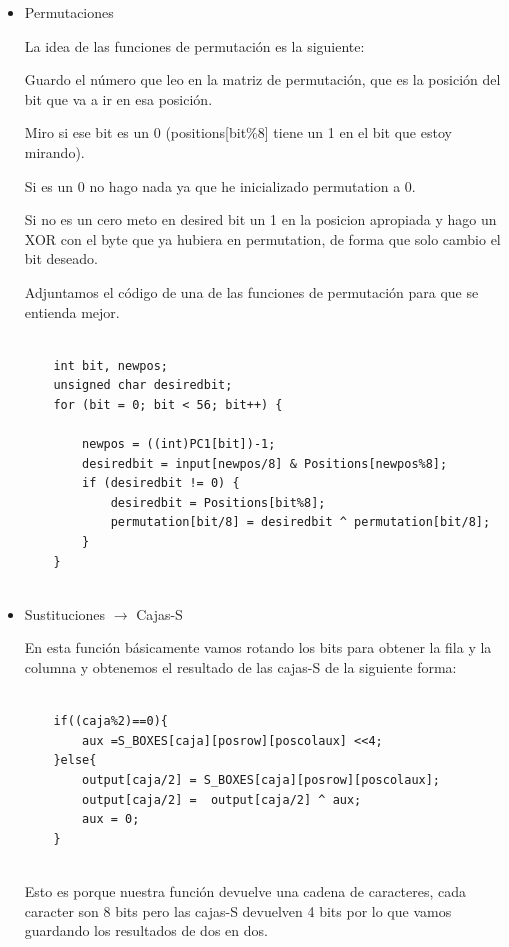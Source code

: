 \documentclass{apuntes}
\begin{document}
\begin{itemize}
	\item Permutaciones
	
	La idea de las funciones de permutación es la siguiente:
	
	Guardo el número que leo en la matriz de permutación, que es la posición del bit que va a ir en esa posición.
	
	Miro si ese bit es un 0 (positions[bit\%8] tiene un 1 en el bit que estoy mirando).
	
	Si es un 0 no hago nada ya que he inicializado permutation a 0.
	
	Si no es un cero meto en desired bit un 1 en la posicion apropiada y hago un 
	XOR con el byte que ya hubiera en permutation, de forma que solo cambio el bit deseado.
	
	Adjuntamos el código de una de las funciones de permutación para que se entienda mejor.
	
	\begin{lstlisting}
	
	int bit, newpos;
	unsigned char desiredbit;
	for (bit = 0; bit < 56; bit++) {
	
		newpos = ((int)PC1[bit])-1;
		desiredbit = input[newpos/8] & Positions[newpos%8]; 
		if (desiredbit != 0) {
			desiredbit = Positions[bit%8];
			permutation[bit/8] = desiredbit ^ permutation[bit/8];
		}
	}
	
	\end{lstlisting}
	
	\item Sustituciones $\rightarrow$ Cajas-S
	
	En esta función básicamente vamos rotando los bits para obtener la fila y la columna y obtenemos el resultado de las cajas-S de la siguiente forma:
	
	\begin{lstlisting}
	
	if((caja%2)==0){
		aux =S_BOXES[caja][posrow][poscolaux] <<4;
	}else{
		output[caja/2] = S_BOXES[caja][posrow][poscolaux];
		output[caja/2] =  output[caja/2] ^ aux;
		aux = 0;
	}
	
	\end{lstlisting}
	
	Esto es porque nuestra función devuelve una cadena de caracteres, cada caracter son 8 bits pero las cajas-S devuelven 4 bits por lo que vamos guardando los resultados de dos en dos.
	
\end{itemize}
\end{document}
